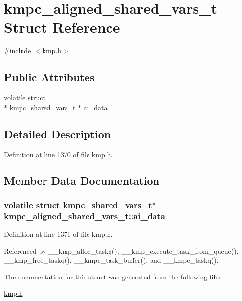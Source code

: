 \hypertarget{structkmpc__aligned__shared__vars__t}{\section{kmpc\-\_\-aligned\-\_\-shared\-\_\-vars\-\_\-t Struct Reference}
\label{structkmpc__aligned__shared__vars__t}
}


{\ttfamily \#include $<$kmp.\-h$>$}

\subsection*{Public Attributes}
\begin{DoxyCompactItemize}
\item 
volatile struct \\*
\hyperlink{structkmpc__shared__vars__t}{kmpc\-\_\-shared\-\_\-vars\-\_\-t} $\ast$ \hyperlink{structkmpc__aligned__shared__vars__t_a1b5d58f6227a7718f53797cd653993b2}{ai\-\_\-data}
\end{DoxyCompactItemize}


\subsection{Detailed Description}


Definition at line 1370 of file kmp.\-h.



\subsection{Member Data Documentation}
\hypertarget{structkmpc__aligned__shared__vars__t_a1b5d58f6227a7718f53797cd653993b2}{
\subsubsection[{ai\-\_\-data}]{\setlength{\rightskip}{0pt plus 5cm}volatile struct {\bf kmpc\-\_\-shared\-\_\-vars\-\_\-t}$\ast$ kmpc\-\_\-aligned\-\_\-shared\-\_\-vars\-\_\-t\-::ai\-\_\-data}}\label{structkmpc__aligned__shared__vars__t_a1b5d58f6227a7718f53797cd653993b2}


Definition at line 1371 of file kmp.\-h.



Referenced by \-\_\-\-\_\-kmp\-\_\-alloc\-\_\-taskq(), \-\_\-\-\_\-kmp\-\_\-execute\-\_\-task\-\_\-from\-\_\-queue(), \-\_\-\-\_\-kmp\-\_\-free\-\_\-taskq(), \-\_\-\-\_\-kmpc\-\_\-task\-\_\-buffer(), and \-\_\-\-\_\-kmpc\-\_\-taskq().



The documentation for this struct was generated from the following file\-:\begin{DoxyCompactItemize}
\item 
\hyperlink{kmp_8h}{kmp.\-h}\end{DoxyCompactItemize}
